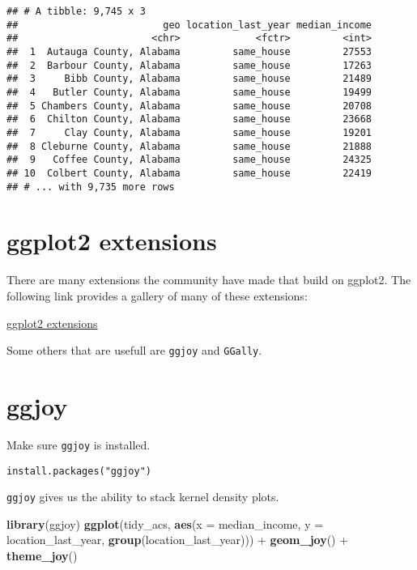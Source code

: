 \documentclass[]{book}
\newenvironment{Shaded}{\begin{snugshade}}{\end{snugshade}}
\newcommand{\KeywordTok}[1]{\textcolor[rgb]{0.13,0.29,0.53}{\textbf{{#1}}}}
\newcommand{\DataTypeTok}[1]{\textcolor[rgb]{0.13,0.29,0.53}{{#1}}}
\newcommand{\StringTok}[1]{\textcolor[rgb]{0.31,0.60,0.02}{{#1}}}
\newcommand{\NormalTok}[1]{{#1}}
\theoremstyle{definition}
\theoremstyle{definition}
\theoremstyle{remark}
\begin{document}
\begin{verbatim}
## # A tibble: 9,745 x 3
##                         geo location_last_year median_income
##                       <chr>             <fctr>         <int>
##  1  Autauga County, Alabama         same_house         27553
##  2  Barbour County, Alabama         same_house         17263
##  3     Bibb County, Alabama         same_house         21489
##  4   Butler County, Alabama         same_house         19499
##  5 Chambers County, Alabama         same_house         20708
##  6  Chilton County, Alabama         same_house         23668
##  7     Clay County, Alabama         same_house         19201
##  8 Cleburne County, Alabama         same_house         21888
##  9   Coffee County, Alabama         same_house         24325
## 10  Colbert County, Alabama         same_house         22419
## # ... with 9,735 more rows
\end{verbatim}

\section{ggplot2 extensions}\label{ggplot2-extensions}

There are many extensions the community have made that build on ggplot2.
The following link provides a gallery of many of these extensions:

\href{http://www.ggplot2-exts.org/gallery}{ggplot2 extensions}

Some others that are usefull are \texttt{ggjoy} and \texttt{GGally}.

\section{ggjoy}\label{ggjoy}

Make sure \texttt{ggjoy} is installed.

\begin{verbatim}
install.packages("ggjoy")
\end{verbatim}

\texttt{ggjoy} gives us the ability to stack kernel density plots.

\begin{Shaded}
\begin{Highlighting}[]
\KeywordTok{library}\NormalTok{(ggjoy)}
\KeywordTok{ggplot}\NormalTok{(tidy_acs, }\KeywordTok{aes}\NormalTok{(}\DataTypeTok{x =} \NormalTok{median_income, }\DataTypeTok{y =} \NormalTok{location_last_year, }\KeywordTok{group}\NormalTok{(location_last_year))) +}
\StringTok{  }\KeywordTok{geom_joy}\NormalTok{() +}
\StringTok{  }\KeywordTok{theme_joy}\NormalTok{()}
\end{Highlighting}
\end{Shaded}
\end{document}
